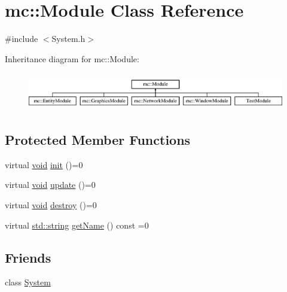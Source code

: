 \hypertarget{classmc_1_1_module}{}\section{mc\+:\+:Module Class Reference}
\label{classmc_1_1_module}


{\ttfamily \#include $<$System.\+h$>$}

Inheritance diagram for mc\+:\+:Module\+:\begin{figure}[H]
\begin{center}
\leavevmode
\includegraphics[height=1.659259cm]{classmc_1_1_module}
\end{center}
\end{figure}
\subsection*{Protected Member Functions}
\begin{DoxyCompactItemize}
\item 
virtual \hyperlink{_s_d_l__opengles2__gl2ext_8h_ae5d8fa23ad07c48bb609509eae494c95}{void} \hyperlink{classmc_1_1_module_a854aad3bb8a2f60446fb14aeb28967b6}{init} ()=0
\item 
virtual \hyperlink{_s_d_l__opengles2__gl2ext_8h_ae5d8fa23ad07c48bb609509eae494c95}{void} \hyperlink{classmc_1_1_module_a6417f3db90ae235fb1be01ed6a3d612c}{update} ()=0
\item 
virtual \hyperlink{_s_d_l__opengles2__gl2ext_8h_ae5d8fa23ad07c48bb609509eae494c95}{void} \hyperlink{classmc_1_1_module_abf13bd45de10185d4139dfff22a555d2}{destroy} ()=0
\item 
virtual \hyperlink{_s_d_l__opengl__glext_8h_ae84541b4f3d8e1ea24ec0f466a8c568b}{std\+::string} \hyperlink{classmc_1_1_module_aa6d981a55ad5c04a39768e3ddcb0ad49}{get\+Name} () const  =0
\end{DoxyCompactItemize}
\subsection*{Friends}
\begin{DoxyCompactItemize}
\item 
class \hyperlink{classmc_1_1_module_af18a9ee98e70982bfe2975391d7221a5}{System}
\end{DoxyCompactItemize}


